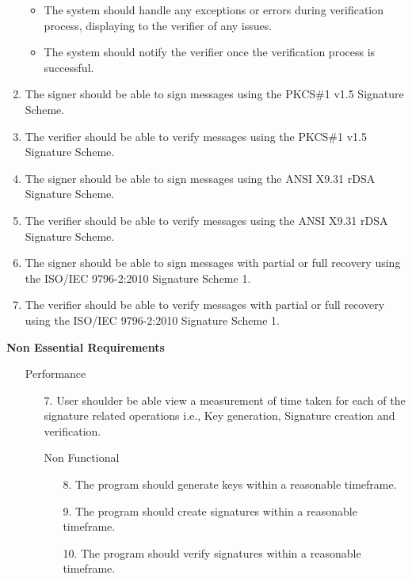\documentclass[]{final_report}
\theoremstyle{definition}
\begin{document}
\begin{enumerate}
\begin{itemize}
\item The system should handle any exceptions or errors during verification process, displaying to the verifier of any issues.
\item The system should notify the verifier once the verification process is successful.
\end{itemize}
\item The signer should be able to sign messages using the PKCS\#1 v1.5 Signature Scheme.
\item The verifier should be able to verify messages using the PKCS\#1 v1.5 Signature Scheme.
\item The signer should be able to sign messages using the ANSI X9.31 rDSA Signature Scheme.
\item The verifier should be able to verify messages using the ANSI X9.31 rDSA Signature Scheme.
\item The signer should be able to sign messages with partial or full recovery using the ISO/IEC 9796-2:2010 Signature Scheme 1.
\item The verifier should be able to verify messages with partial or full recovery using the ISO/IEC 9796-2:2010 Signature Scheme 1.
\end{enumerate}

\textbf{Non Essential Requirements}
\begin{enumerate}
\item[] Performance
\begin{enumerate}
\item[7.] User shoulder be able view a measurement of time taken for each of the signature related operations i.e., Key generation, Signature creation and verification.
\item[] Non Functional
\begin{itemize}
\item[8.] The program should generate keys within a reasonable timeframe.
\item[9.] The program should create signatures within a reasonable timeframe.
\item[10.] The program should verify signatures within a reasonable timeframe.
\end{itemize}
\end{enumerate}
\end{enumerate}
\end{document}
